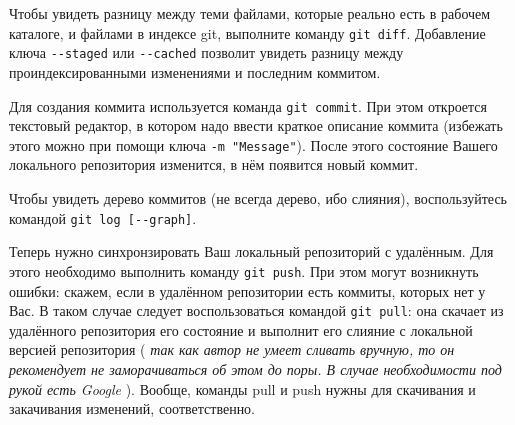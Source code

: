 \documentclass{article}
\begin{document}
Чтобы увидеть разницу между теми файлами, которые реально есть в рабочем каталоге, и файлами в индексе git, выполните команду \texttt{git diff}. Добавление ключа \texttt{-{}-staged} или \texttt{-{}-cached} позволит увидеть разницу между проиндексированными изменениями и последним коммитом.

Для создания коммита используется команда \texttt{git commit}. При этом откроется текстовый редактор, в котором надо ввести краткое описание коммита (избежать этого можно при помощи ключа \texttt{-m "Message"}). После этого состояние Вашего локального репозитория изменится, в нём появится новый коммит. 

Чтобы увидеть дерево коммитов (не всегда дерево, ибо слияния), воспользуйтесь командой \texttt{git log [-{}-graph]}.

Теперь нужно синхронзировать Ваш локальный репозиторий с удалённым. Для этого необходимо выполнить команду \texttt{git push}. При этом могут возникнуть ошибки: скажем, если в удалённом репозитории есть коммиты, которых нет у Вас. В таком случае следует воспользоваться командой \texttt{git pull}: она скачает из удалённого репозитория его состояние и выполнит его слияние с локальной версией репозитория (\emph{\color{red} так как автор не умеет сливать вручную, то он рекомендует не заморачиваться об этом до поры. В случае необходимости под рукой есть Google \Smiley}). Вообще, команды pull и push нужны для скачивания и закачивания изменений, соответственно.
\end{document}
